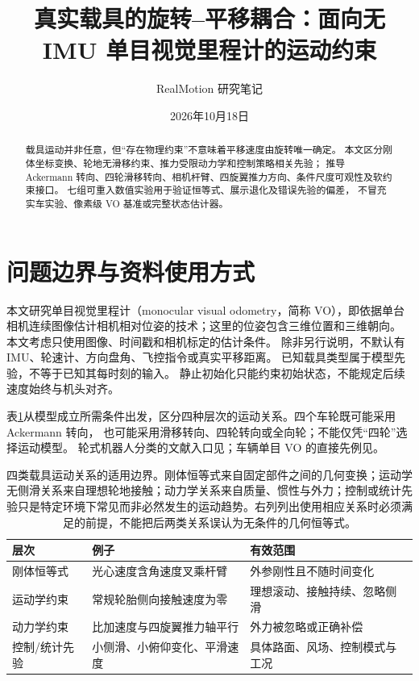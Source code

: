 \documentclass[UTF8,a4paper,fontset=fandol,11pt]{ctexart}
\title{真实载具的旋转--平移耦合：\newline 面向无 IMU 单目视觉里程计的运动约束}
\author{RealMotion 研究笔记}
\date{2026年10月18日}
\begin{document}
\maketitle
\begin{abstract}
载具运动并非任意，但“存在物理约束”不意味着平移速度由旋转唯一确定。
本文区分刚体坐标变换、轮地无滑移约束、推力受限动力学和控制策略相关先验；
推导 Ackermann 转向、四轮滑移转向、相机杆臂、四旋翼推力方向、条件尺度可观性及软约束接口。
七组可重入数值实验用于验证恒等式、展示退化及错误先验的偏差，
不冒充实车实验、像素级 VO 基准或完整状态估计器。
\end{abstract}
\tableofcontents

\section{问题边界与资料使用方式}
本文研究单目视觉里程计（monocular visual odometry，简称 VO），即依据单台相机连续图像估计相机相对位姿的技术；这里的位姿包含三维位置和三维朝向。
本文考虑只使用图像、时间戳和相机标定的估计条件。
除非另行说明，不默认有 IMU、轮速计、方向盘角、飞控指令或真实平移距离。
已知载具类型属于模型先验，不等于已知其每时刻的输入。
静止初始化只能约束初始状态，不能规定后续速度始终与机头对齐。

表\ref{tab:levels}从模型成立所需条件出发，区分四种层次的运动关系。四个车轮既可能采用 Ackermann 转向，
也可能采用滑移转向、四轮转向或全向轮；不能仅凭“四轮”选择运动模型。
轮式机器人分类的文献入口见\cite{campion}；车辆单目 VO 的直接先例见\cite{onepoint,ijcv,priors}。

\begin{table}[htbp]
\centering\small
\caption{四类载具运动关系的适用边界。刚体恒等式来自固定部件之间的几何变换；运动学无侧滑关系来自理想轮地接触；动力学关系来自质量、惯性与外力；控制或统计先验只是特定环境下常见而非必然发生的运动趋势。右列列出使用相应关系时必须满足的前提，不能把后两类关系误认为无条件的几何恒等式。}\label{tab:levels}
\begin{tabular}{p{.17\linewidth}p{.36\linewidth}p{.36\linewidth}}
\toprule
层次 & 例子 & 有效范围 \\
\midrule
刚体恒等式 & 光心速度含角速度叉乘杆臂 & 外参刚性且不随时间变化 \\
运动学约束 & 常规轮胎侧向接触速度为零 & 理想滚动、接触持续、忽略侧滑 \\
动力学约束 & 比加速度与四旋翼推力轴平行 & 外力被忽略或正确补偿 \\
控制/统计先验 & 小侧滑、小俯仰变化、平滑速度 & 具体路面、风场、控制模式与工况 \\
\bottomrule
\end{tabular}
\end{table}
\end{document}

